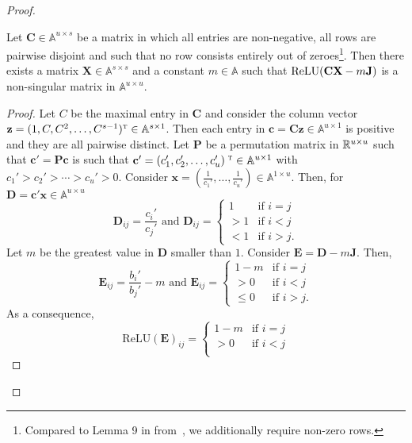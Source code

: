 \begin{proof}
\begin{lemma}\label{lem:ReLUlemma9}
  Let  $\mathbf{C}\in \mathbb{A}^{u\times s}$ be a matrix in which 
  all entries are non-negative, all rows are pairwise disjoint and such that no row consists entirely
  out of zeroes\footnote{Compared to Lemma 9 in from~\cite{grohewl},
 we additionally require non-zero rows.}.
  Then there exists a matrix $\mathbf{X}\in\mathbb{A}^{s\times s}$ and a constant $m\in\mathbb{A}$
  such that $\text{\normalfont ReLU}(\mathbf{CX}-m\mathbf{J})$ is a
  non-singular matrix in $\mathbb{A}^{u\times u}$.
\end{lemma}
\begin{proof}
Let $C$ be the maximal entry in $\mathbf{C}$ and consider the column vector $\mathbf{z}=(1,C,C^2,\ldots,C^{s-1})^{\textsc{t}}\in\mathbb{A}^{s\times 1}$.
Then each entry in $\mathbf{c}=\mathbf{C}\mathbf{z}\in\mathbb{A}^{u\times 1}$ is positive and they are all pairwise distinct. 
Let $\mathbf{P}$ be a permutation matrix in $\Rb^{u\times u}$ such that $\mathbf{c}'=\mathbf{P}\mathbf{c}$ is such that  $\mathbf{c}'=(c_1',c_2',\ldots,c_u')^{\textsc{	t}}\in\mathbb{A}^{u\times 1}$ with $c_1'> c_2'>\cdots > c_u'>0$. 
Consider $\mathbf{x}=\left(\frac{1}{c_1'},\ldots,\frac{1}{c_u'}\right)\in \mathbb{A}^{1\times u}$. Then, for $\mathbf{D}=\mathbf{c}'\mathbf{x}\in\mathbb{A}^{u\times u}$
$$
\mathbf{D}_{ij}=\frac{c_i'}{c_j'}  \text{ and } \mathbf{D}_{ij}=\begin{cases}  1 & \text{if $i=j$}\\
>1 & \text{if $i<j$}\\
< 1 & \text{if $i>j$}.
\end{cases}
$$
Let $m$ be the greatest value  in $\mathbf{D}$ smaller than $1$.
Consider $\mathbf{E}=\mathbf{D}- m\mathbf{J}$.
Then,
$$
\mathbf{E}_{ij}=\frac{b_i'}{b_j'}- m \text{ and } \mathbf{E}_{ij}=\begin{cases}  1-m & \text{if $i=j$} \\
> 0 & \text{if $i<j$}\\
\leq 0  & \text{if $i>j$}.
\end{cases}
$$
As a consequence,
$$
\text{ReLU}(\mathbf{E})_{ij}=\begin{cases}  1-m & \text{if $i=j$}\\
>0 & \text{if $i<j$}\\

\end{cases}$$
\end{proof}
\end{proof}
